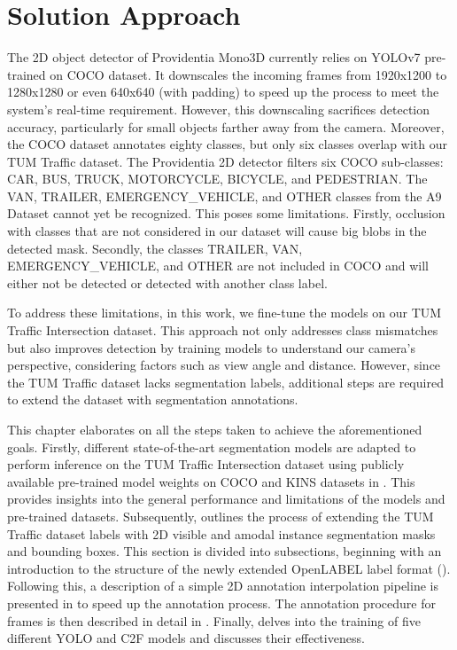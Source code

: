 \chapter{Solution Approach}  \label{chap:four}%

The 2D object detector of Providentia Mono3D currently relies on YOLOv7 pre-trained on COCO dataset. It downscales the incoming frames from 1920x1200 to 1280x1280 or even 640x640 (with padding) to speed up the process to meet the system's real-time requirement. However, this downscaling sacrifices detection accuracy, particularly for small objects farther away from the camera. Moreover, the COCO dataset annotates eighty classes, but only six classes overlap with our TUM Traffic dataset. The Providentia 2D detector filters six COCO sub-classes: CAR, BUS, TRUCK, MOTORCYCLE, BICYCLE, and PEDESTRIAN. The VAN, TRAILER, EMERGENCY\_VEHICLE, and OTHER classes from the A9 Dataset cannot yet be recognized. This poses some limitations. Firstly, occlusion with classes that are not considered in our dataset will cause big blobs in the detected mask. Secondly, the classes TRAILER, VAN, EMERGENCY\_VEHICLE, and OTHER are not included in COCO and will either not be detected or detected with another class label. 

To address these limitations, in this work, we fine-tune the models on our TUM Traffic Intersection dataset. This approach not only addresses class mismatches but also improves detection by training models to understand our camera's perspective, considering factors such as view angle and distance. However, since the TUM Traffic dataset lacks segmentation labels, additional steps are required to extend the dataset with segmentation annotations.

This chapter elaborates on all the steps taken to achieve the aforementioned goals. Firstly, different state-of-the-art segmentation models are adapted to perform inference on the TUM Traffic Intersection dataset using publicly available pre-trained model weights on COCO and KINS datasets in . This provides insights into the general performance and limitations of the models and pre-trained datasets. Subsequently,  outlines the process of extending the TUM Traffic dataset labels with 2D visible and amodal instance segmentation masks and bounding boxes. This section is divided into subsections, beginning with an introduction to the structure of the newly extended OpenLABEL label format (). Following this, a description of a simple 2D annotation interpolation pipeline is presented in  to speed up the annotation process. The annotation procedure for frames is then described in detail in . Finally,  delves into the training of five different YOLO and C2F models and discusses their effectiveness.

